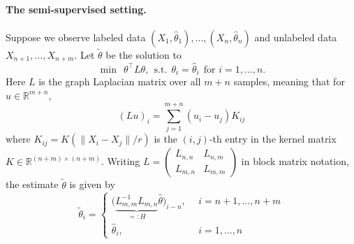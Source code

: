 \documentclass{article}
\newcommand{\Reals}{\mathbb{R}}
\newcommand{\1}{\mathbf{1}}
\newcommand{\wt}[1]{\widetilde{#1}}
\newcommand{\wh}[1]{\widehat{#1}}
\theoremstyle{definition}
\theoremstyle{remark}
\begin{document}
\paragraph{The semi-supervised setting.}

Suppose we observe labeled data $(X_1,\wh{\theta}_1),\ldots,(X_n,\wh{\theta}_n)$ and unlabeled data $X_{n + 1},\ldots,X_{n + m}$. Let $\wt{\theta}$ be the solution to
\begin{equation*}
\min~~\theta^{\top} L \theta,~~\textrm{s.t.}~~\theta_i = \wh{\theta}_i~~\textrm{for $i = 1,\ldots,n$.}
\end{equation*}
Here $L$ is the graph Laplacian matrix over all $m + n$ samples, meaning that for $u \in \Reals^{m + n}$,
\begin{equation*}
(Lu)_i = \sum_{j = 1}^{m + n} (u_i - u_j) K_{ij}
\end{equation*}
where $K_{ij} = K(\|X_i - X_j\|/r)$ is the $(i,j)$-th entry in the kernel matrix $K \in \Reals^{(n + m) \times (n + m)}$.  Writing 
$L =
\begin{pmatrix}
L_{n,n} & L_{n,m} \\
L_{m,n} & L_{m,m}
\end{pmatrix}
$ in block matrix notation, the estimate $\wt{\theta}$ is given by
\begin{equation*}
\wt{\theta}_i = 
\begin{cases}
\bigl(\underbrace{L_{m,m}^{-1} L_{m,n}}_{=: H} \wh{\theta}\bigr)_{i - n},~~ & i = n + 1,\ldots,n + m\\
\wh{\theta}_i,~~ & i = 1,\ldots,n
\end{cases}
\end{equation*}
\end{document}
